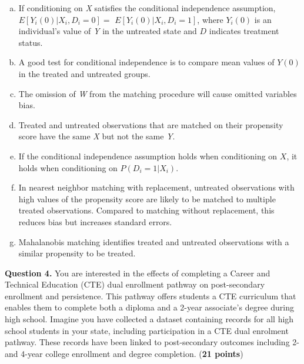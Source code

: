 \documentclass[12pt]{article}
\begin{document}
\begin{enumerate}[(a)]
 \setlength\itemsep{1.5em}
\item If conditioning on \textit{X} satisfies the conditional independence assumption, $E[Y_i(0)| X_i, D_i= 0] =$ $E[Y_i(0) | X_i, D_i= 1]$, where $Y_i(0)$ is an individual's value of \textit{Y} in the untreated state and $D$ indicates treatment status.

\item A good test for conditional independence is to compare mean values of $Y(0)$ in the treated and untreated groups.

\item The omission of \textit{W} from the matching procedure will cause omitted variables bias.

\item Treated and untreated observations that are matched on their propensity score have the same \textit{X} but not the same \textit{Y}.

\item If the conditional independence assumption holds when conditioning on $X$, it holds when conditioning on $P(D_i=1|X_i)$.

\item In nearest neighbor matching with replacement, untreated observations with high values of the propensity score are likely to be matched to multiple treated observations. Compared to matching without replacement, this reduces bias but increases standard errors.

\item Mahalanobis matching identifies treated and untreated observations with a similar propensity to be treated.
\end{enumerate}


\pagebreak



\textbf{Question 4.} You are interested in the effects of completing a Career and Technical Education (CTE) dual enrollment pathway on post-secondary enrollment and persistence. This pathway offers students a CTE curriculum that enables them to complete both a diploma and a 2-year associate's degree during high school. Imagine you have collected a dataset containing records for all high school students in your state, including participation in a CTE dual enrolment pathway. These records have been linked to post-secondary outcomes including 2- and 4-year college enrollment and degree completion. ({\bf 21 points})
\end{document}
